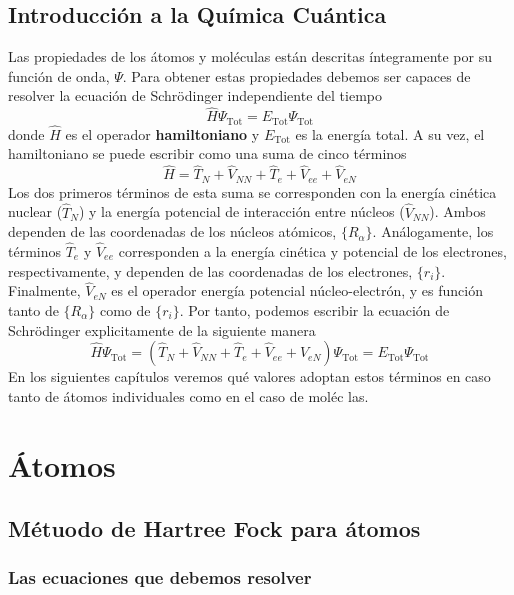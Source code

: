 \documentclass{tufte-book}
\begin{document}
\section{Introducción a la Química Cuántica}
Las propiedades de los átomos y moléculas están descritas
íntegramente por su función de onda, $\Psi$. Para obtener estas 
propiedades debemos ser capaces de resolver la ecuación 
de Schrödinger independiente del tiempo
\begin{equation}
    \hat{H}\Psi_\mathrm{Tot}=E_\mathrm{Tot}\Psi_\mathrm{Tot} 
\end{equation}
donde $\hat{H}$ es el operador \textbf{hamiltoniano} y
$E_\mathrm{Tot}$ es la energía total. A su vez, el 
hamiltoniano se puede escribir como una suma de cinco términos
\begin{equation}
    \hat{H} = \hat{T}_N + \hat{V}_{NN} + \hat{T}_e + \hat{V}_{ee} +\hat{V}_{eN}
\end{equation}
Los dos primeros términos de esta suma se corresponden con la 
energía cinética nuclear ($\hat{T}_N$) y la energía potencial de
interacción entre núcleos ($\hat{V}_{NN}$). Ambos dependen de las
coordenadas de los núcleos atómicos, $\{R_\alpha\}$. Análogamente, 
los términos $\hat{T}_e $ y $\hat{V}_{ee}$ corresponden a la 
energía cinética y potencial de los electrones, respectivamente, y
dependen de las coordenadas de los electrones, $\{r_i\}$.
Finalmente, $\hat{V}_{eN}$ es el operador energía potencial
núcleo-electrón, y es función tanto de $\{R_\alpha\}$ como de 
$\{r_i\}$. Por tanto, podemos escribir la ecuación de Schrödinger
explicitamente de la siguiente manera
\begin{equation}
    \hat{H}\Psi_\mathrm{Tot}   =
    (\hat{T}_N + \hat{V}_{NN} + \hat{T}_e + \hat{V}_{ee} +\hat{V}_{eN})\Psi_\mathrm{Tot} 
    = E_\mathrm{Tot}\Psi_\mathrm{Tot}
\end{equation}
En los siguientes capítulos veremos qué valores adoptan
estos términos en caso tanto de átomos individuales
como en el caso de moléc
las.
\chapter{Átomos}

\section{Métuodo de Hartree Fock para átomos}
\subsection{Las ecuaciones que debemos resolver}
\end{document}
